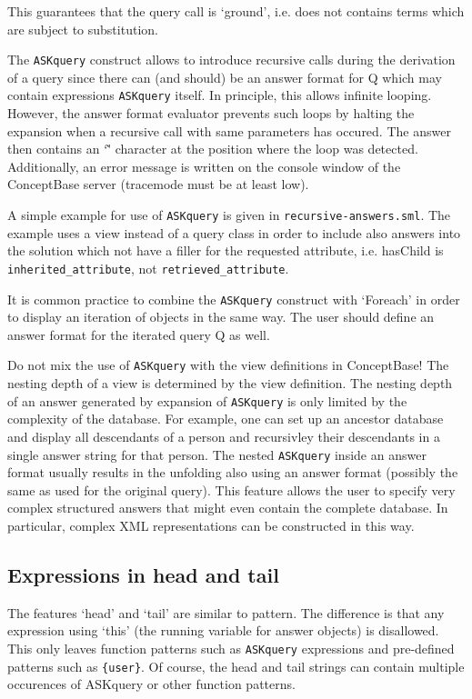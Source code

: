 This guarantees that the query call is `ground', i.e. does not contains terms which are subject to substitution.

The {\tt ASKquery} construct allows to introduce recursive calls during the derivation of a query since there can (and should) be an answer format for Q
which may contain expressions {\tt ASKquery} itself. In principle, this allows infinite looping. However, the answer format evaluator prevents such
loops by halting the expansion when a recursive call with same parameters has occured. The answer then contains an `\~' character at the position
where the loop was detected. Additionally, an error message is written on the console window
of the ConceptBase server (tracemode must be at least low).

A simple example for use of {\tt ASKquery} is given in {\tt recursive-answers.sml}. The example uses a view instead of a query class in order to include
also answers into the solution which not have a filler for the requested attribute, i.e. hasChild is {\tt inherited\_attribute}, not
{\tt retrieved\_attribute}.

It is common practice to combine the {\tt ASKquery} construct with `Foreach' in order to display an iteration of objects in the same way. The user
should define an answer format for the iterated query Q as well.

Do not mix the use of {\tt ASKquery} with the view definitions in ConceptBase! The nesting depth of a view is determined by the view definition. The
nesting depth of an answer generated by expansion of {\tt ASKquery} is only limited by the complexity of the database. For example, one can set up
an ancestor database and display all descendants of a person and recursivley their descendants in a single answer string for that person.
The nested {\tt ASKquery} inside an answer format usually results in the unfolding also using
an answer format (possibly the same as used for the original query). This feature
allows the user to specify very complex structured answers that might even contain the
complete database. In particular, complex XML representations can be constructed
in this way.


\subsection{Expressions in head and tail}

The features `head' and `tail' are similar to pattern. The difference is that any expression using `this' (the running variable for answer objects) is disallowed.
This only leaves function patterns such as {\tt ASKquery} expressions and pre-defined patterns such as  \verb+{user}+.
Of course, the head and tail strings can contain multiple occurences
of ASKquery or other function patterns.


